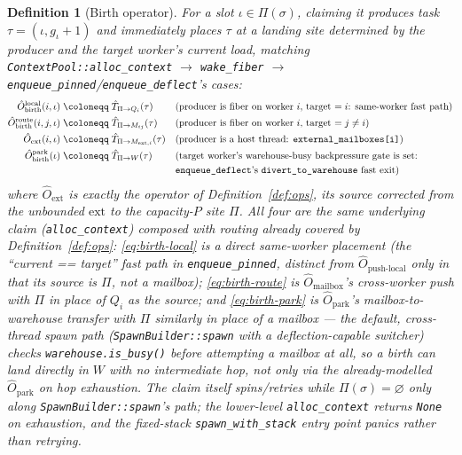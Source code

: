 \documentclass[11pt,a4paper]{report}
\newtheorem{definition}{Definition}[section]
\newcommand{\Trf}[2]{\hat{T}_{#1 \to #2}}
\newcommand{\code}[1]{\texttt{#1}}
\begin{document}
\begin{definition}[Birth operator]
\label{def:birth}
For a slot $\iota \in \Pi(\sigma)$, claiming it produces task
$\tau = (\iota, g_\iota + 1)$ and immediately places $\tau$ at a
landing site determined by the producer and the target worker's
current load, matching \code{ContextPool::alloc\_context} $\to$
\code{wake\_fiber} $\to$
\code{enqueue\_pinned}/\code{enqueue\_deflect}'s cases:
\begin{align}
  \hat{O}_{\text{birth}}^{\text{local}}(i,\iota) &\;\coloneqq\;
    \Trf{\Pi}{Q_i}(\tau)
    &&\text{(producer is fiber on worker $i$, target $= i$: same-worker fast path)}
    \label{eq:birth-local}\\
  \hat{O}_{\text{birth}}^{\text{route}}(i,j,\iota) &\;\coloneqq\;
    \Trf{\Pi}{M_{ij}}(\tau)
    &&\text{(producer is fiber on worker $i$, target $=j\neq i$)}
    \label{eq:birth-route}\\
  \hat{O}_{\text{ext}}(i,\iota) &\;\coloneqq\;
    \Trf{\Pi}{M_{\text{ext},i}}(\tau)
    &&\text{(producer is a host thread: \code{external\_mailboxes[i]})}
    \label{eq:ext-revised}\\
  \hat{O}_{\text{birth}}^{\text{park}}(\iota) &\;\coloneqq\;
    \Trf{\Pi}{W}(\tau)
    &&\text{(target worker's warehouse-busy backpressure gate is set:}
    \nonumber\\
    &&&\text{\code{enqueue\_deflect}'s \code{divert\_to\_warehouse} fast exit)}
    \label{eq:birth-park}
\end{align}
where $\hat{O}_{\text{ext}}$ is exactly the operator of
Definition~\ref{def:ops}, its source corrected from the unbounded
$\text{ext}$ to the capacity-$P$ site $\Pi$. All four are the same
underlying claim (\code{alloc\_context}) composed with routing already
covered by Definition~\ref{def:ops}: \eqref{eq:birth-local} is a
direct same-worker placement (the ``current == target'' fast path in
\code{enqueue\_pinned}, distinct from $\hat{O}_{\text{push-local}}$
only in that its source is $\Pi$, not a mailbox); \eqref{eq:birth-route}
is $\hat{O}_{\text{mailbox}}$'s cross-worker push with $\Pi$ in place
of $Q_i$ as the source; and \eqref{eq:birth-park} is
$\hat{O}_{\text{park}}$'s mailbox-to-warehouse transfer with $\Pi$
similarly in place of a mailbox --- the default, cross-thread spawn
path (\code{SpawnBuilder::spawn} with a deflection-capable switcher)
checks \code{warehouse.is\_busy()} \emph{before} attempting a mailbox
at all, so a birth can land directly in $W$ with no intermediate hop,
not only via the already-modelled $\hat{O}_{\text{park}}$ on hop
exhaustion. The claim itself spins/retries while $\Pi(\sigma) =
\varnothing$ only along \code{SpawnBuilder::spawn}'s path; the
lower-level \code{alloc\_context} returns \code{None} on exhaustion,
and the fixed-stack \code{spawn\_with\_stack} entry point panics
rather than retrying.
\end{definition}
\end{document}
